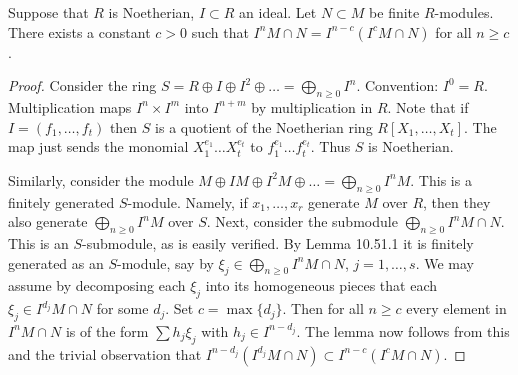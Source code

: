 \begin{lemma}
Suppose that $R$ is Noetherian, $I\subset R$ an ideal. Let $N\subset M$ be finite $R$-modules. There exists a constant $c>0$ such that $I^nM\cap N=I^{n-c}(I^cM\cap N)$ for all $n\geq c$.
\end{lemma}
\begin{proof}
Consider the ring $S=R\oplus I\oplus I^2\oplus\ldots=\bigoplus_{n\geq0}I^n$. Convention: $I^0=R$. Multiplication maps $I^n\times I^m$ into $I^{n+m}$ by multiplication in $R$. Note that if $I=(f_1,\ldots,f_t)$ then $S$ is a quotient of the Noetherian ring $R[X_1,\ldots,X_t]$. The map just sends the monomial $X_1^{e_1}\ldots X_t^{e_t}$ to $f_1^{e_1}\ldots f_t^{e_t}$. Thus $S$ is Noetherian.

Similarly, consider the module $M\oplus IM\oplus I^2M\oplus\ldots=\bigoplus_{n\geq0}I^nM$. This is a finitely generated $S$-module. Namely, if $x_1,\ldots,x_r$ generate $M$ over $R$, then they also generate $\bigoplus_{n\geq0}I^nM$ over $S$. Next, consider the submodule $\bigoplus_{n\geq0}I^nM\cap N$. This is an $S$-submodule, as is easily verified. By Lemma 10.51.1 it is finitely generated as an $S$-module, say by $\xi_j\in\bigoplus_{n\geq0}I^nM\cap N$, $j=1,\ldots,s$. We may assume by decomposing each $\xi_j$ into its homogeneous pieces that each $\xi_j\in I^{d_j}M\cap N$ for some $d_j$. Set $c=\max\{d_j\}$. Then for all $n\geq c$ every element in $I^nM\cap N$ is of the form $\sum h_j\xi_j$ with $h_j\in I^{n-d_j}$. The lemma now follows from this and the trivial observation that $I^{n-d_j}(I^{d_j}M\cap N)\subset I^{n-c}(I^cM\cap N)$.
\end{proof}

